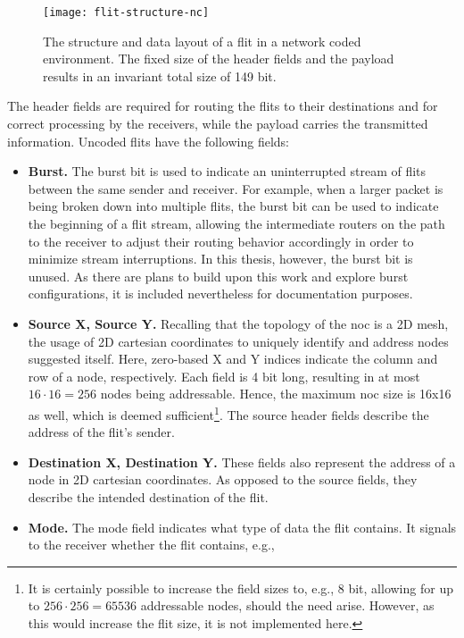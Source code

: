 \begin{figure}
    \centering
    \texttt{[image: flit-structure-nc]}
    \caption[Structure of a flit with network coding]{The structure and data layout of a flit in a network coded environment. The fixed size of
    the header fields and the payload results in an invariant total size of 149 bit.}
    \label{fig:flitstructurenetworkcoded}
\end{figure}

The header fields are required for routing the flits to their destinations and for correct processing by the receivers, while the payload carries the
transmitted information. Uncoded flits have the following fields:
\begin{itemize}
    \item \textbf{Burst.} The burst bit is used to indicate an uninterrupted stream of flits between the same sender and receiver. For example, when a
        larger packet is being broken down into multiple flits, the burst bit can be used to indicate the beginning of a flit stream, allowing the
        intermediate routers on the path to the receiver to adjust their routing behavior accordingly in order to minimize stream interruptions. In
        this thesis, however, the burst bit is unused. As there are plans to build upon this work and explore burst configurations, it is included
        nevertheless for documentation purposes.
    \item \textbf{Source X, Source Y.} Recalling that the topology of the \gls{noc} is a 2D mesh, the usage of 2D cartesian coordinates to uniquely
        identify and address nodes suggested itself. Here, zero-based X and Y indices indicate the column and row of a node, respectively. Each field is 4 bit long,
        resulting in at most $16 \cdot 16 = 256$ nodes being addressable. Hence, the maximum \gls{noc} size is 16x16 as well, which is deemed
        sufficient\footnote{It is certainly possible to increase the field sizes to, e.g., 8 bit, allowing for up to $256 \cdot 256 = 65536$ addressable
        nodes, should the need arise. However, as this would increase the flit size, it is not implemented here.}. The source header fields describe
        the address of the flit's sender.
    \item \textbf{Destination X, Destination Y.} These fields also represent the address of a node in 2D cartesian coordinates. As opposed to the
        source fields, they describe the intended destination of the flit.
    \item \textbf{Mode.} The mode field indicates what type of data the flit contains. It signals to the receiver whether the flit contains, e.g.,

\end{itemize}

